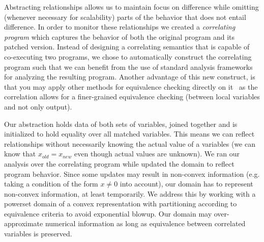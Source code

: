 Abstracting relationships allows us to maintain focus on difference while
omitting (whenever necessary for scalability) parts of the behavior that does
not entail difference. In order to monitor these relationships we created a
\emph{correlating program} which captures the behavior of both the original
program and its patched version. Instead of designing a correlating semantics
that is capable of co-executing two programs, we chose to automatically
construct the correlating program such that we can benefit from the use of
standard analysis frameworks for analyzing the resulting program. Another
advantage of this new construct, is that you may apply other methods for
equivalence checking directly on it~\cite{EnglerRamos11} as the correlation
allows for a finer-grained equivalence checking (between local
variables and not only output).

Our abstraction holds data of both sets of variables, joined together and is
initialized to hold equality over all matched variables. This means we can
reflect relationships without necessarily knowing the actual value of a
variables (we can know that $x_{old} = x_{new}$ even though actual values are
unknown). We ran our analysis over the correlating program while updated the
domain to reflect program behavior. Since some updates may result in non-convex information (e.g. taking  a condition of the form $x \neq 0$ into account), our domain has to represent non-convex information, at least temporarily. We address this by working with a powerset domain of a convex representation with partitioning according to equivalence criteria to avoid exponential blowup. Our domain may over-approximate numerical information as long as equivalence between correlated variables is preserved.

